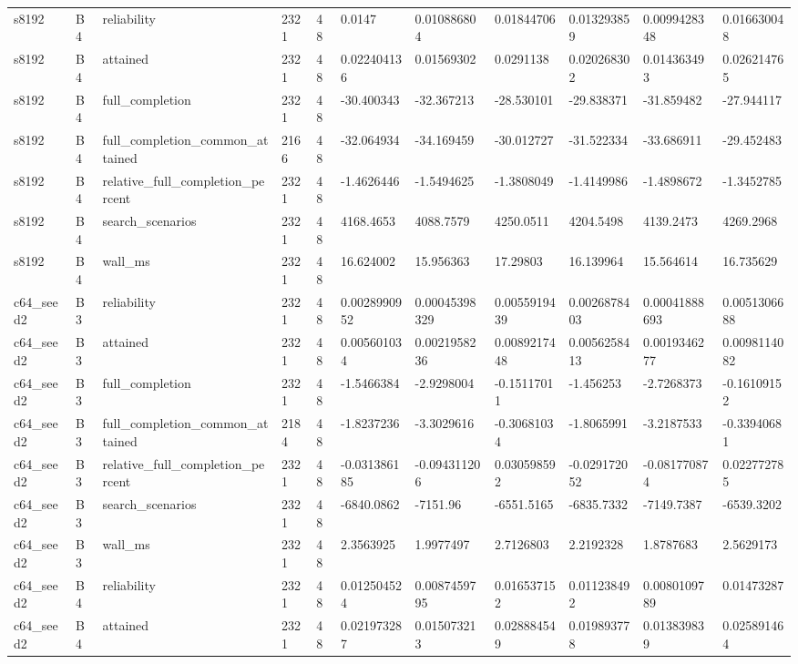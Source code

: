 \begin{longtable}{lllllllllll}
s8192 & B4 & reliability & 2321 & 48 & 0.0147 & 0.010886804 & 0.01844706 & 0.013293859 & 0.0099428348 & 0.016630048 \\
s8192 & B4 & attained & 2321 & 48 & 0.022404136 & 0.01569302 & 0.0291138 & 0.020268302 & 0.014363493 & 0.026214765 \\
s8192 & B4 & full\_completion & 2321 & 48 & -30.400343 & -32.367213 & -28.530101 & -29.838371 & -31.859482 & -27.944117 \\
s8192 & B4 & full\_completion\_common\_attained & 2166 & 48 & -32.064934 & -34.169459 & -30.012727 & -31.522334 & -33.686911 & -29.452483 \\
s8192 & B4 & relative\_full\_completion\_percent & 2321 & 48 & -1.4626446 & -1.5494625 & -1.3808049 & -1.4149986 & -1.4898672 & -1.3452785 \\
s8192 & B4 & search\_scenarios & 2321 & 48 & 4168.4653 & 4088.7579 & 4250.0511 & 4204.5498 & 4139.2473 & 4269.2968 \\
s8192 & B4 & wall\_ms & 2321 & 48 & 16.624002 & 15.956363 & 17.29803 & 16.139964 & 15.564614 & 16.735629 \\
c64\_seed2 & B3 & reliability & 2321 & 48 & 0.0028990952 & 0.00045398329 & 0.0055919439 & 0.0026878403 & 0.00041888693 & 0.0051306688 \\
c64\_seed2 & B3 & attained & 2321 & 48 & 0.005601034 & 0.0021958236 & 0.0089217448 & 0.0056258413 & 0.0019346277 & 0.0098114082 \\
c64\_seed2 & B3 & full\_completion & 2321 & 48 & -1.5466384 & -2.9298004 & -0.15117011 & -1.456253 & -2.7268373 & -0.16109152 \\
c64\_seed2 & B3 & full\_completion\_common\_attained & 2184 & 48 & -1.8237236 & -3.3029616 & -0.30681034 & -1.8065991 & -3.2187533 & -0.33940681 \\
c64\_seed2 & B3 & relative\_full\_completion\_percent & 2321 & 48 & -0.031386185 & -0.094311206 & 0.030598592 & -0.029172052 & -0.081770874 & 0.022772785 \\
c64\_seed2 & B3 & search\_scenarios & 2321 & 48 & -6840.0862 & -7151.96 & -6551.5165 & -6835.7332 & -7149.7387 & -6539.3202 \\
c64\_seed2 & B3 & wall\_ms & 2321 & 48 & 2.3563925 & 1.9977497 & 2.7126803 & 2.2192328 & 1.8787683 & 2.5629173 \\
c64\_seed2 & B4 & reliability & 2321 & 48 & 0.012504524 & 0.0087459795 & 0.016537152 & 0.011238492 & 0.0080109789 & 0.01473287 \\
c64\_seed2 & B4 & attained & 2321 & 48 & 0.021973287 & 0.015073213 & 0.028884549 & 0.019893778 & 0.013839839 & 0.025891464 \\

\end{longtable}
